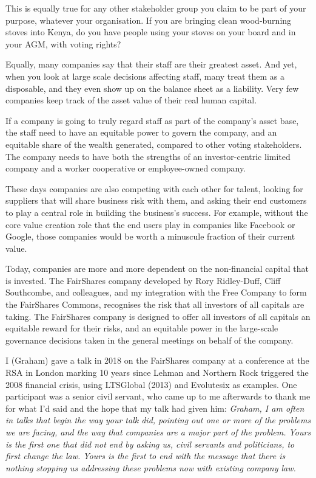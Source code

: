 This is equally true for any other stakeholder group you claim to be part of your purpose, whatever your organisation. If you are bringing clean wood-burning stoves into Kenya, do you have people using your stoves on your board and in your AGM, with voting rights?


Equally, many companies say that their staff are their greatest asset. And yet, when you look at large scale decisions affecting staff, many treat them as a disposable, and they even show up on the balance sheet as a liability. Very few companies keep track of the asset value of their real human capital. 


If a company is going to truly regard staff as part of the company’s asset base, the staff need to have an equitable power to govern the company, and an equitable share of the wealth generated, compared to other voting stakeholders. The company needs to have both the strengths of an investor-centric limited company and a worker cooperative or employee-owned company.


These days companies are also competing with each other for talent, looking for suppliers that will share business risk with them, and asking their end customers to play a central role in building the business’s success. For example, without the core value creation role that the end users play in companies like Facebook or Google, those companies would be worth a minuscule fraction of their current value.


Today, companies are more and more dependent on the non-financial capital that is invested. The FairShares company developed by Rory Ridley-Duff, Cliff Southcombe, and colleagues\cite{duff-fairshares}, and my integration with the Free Company to form the FairShares Commons, recognises the risk that all investors of all capitals are taking. The FairShares company is designed to offer all investors of all capitals an equitable reward for their risks, and an equitable power in the large-scale governance decisions taken in the general meetings on behalf of the company.


\begin{longstoryblock}
I (Graham) gave a talk in 2018 on the FairShares company at a conference at the RSA in London marking 10 years since Lehman and Northern Rock triggered the 2008 financial crisis, using LTSGlobal (2013) and Evolutesix as examples. One participant was a senior civil servant, who came up to me afterwards to thank me for what I'd said and the hope that my talk had given him: 
\emph{ 
Graham, I am often in talks that begin the way your talk did, pointing out one or more of the problems we are facing, and the way that companies are a major part of the problem. Yours is the first one that did not end by asking us, civil servants and politicians, to first change the law. Yours is the first to end with the message that there is nothing stopping us addressing these problems now with existing company law.
}
\end{longstoryblock}


